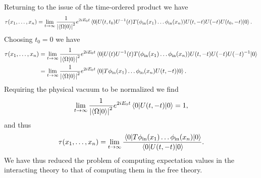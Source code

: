 Returning to the issue of the time-ordered product we have
\begin{align*}
	\tau(x_{1}, \dots, x_{n}) &= \lim\limits_{t\to\infty}\frac{1}{\abs{\braket{\Omega}{0}}^{2}}e^{2iE_{0}t}\expval{U(t, t_{0})U^{-1}(t)\ensuremath{T}(\phi_{\text{in}}(x_{1})\dots\phi_{\text{in}}(x_{n}))U(t, -t)U(-t)U(t_{0}, -t)}{0}.
\end{align*}
Choosing $t_{0} = 0$ we have
\begin{align*}
	\tau(x_{1}, \dots, x_{n}) &= \lim\limits_{t\to\infty}\frac{1}{\abs{\braket{\Omega}{0}}^{2}}e^{2iE_{0}t}\expval{U(t)U^{-1}(t)\ensuremath{T}(\phi_{\text{in}}(x_{1})\dots\phi_{\text{in}}(x_{n}))U(t, -t)U(-t)U(-t)^{-1}}{0} \\
	                          &= \lim\limits_{t\to\infty}\frac{1}{\abs{\braket{\Omega}{0}}^{2}}e^{2iE_{0}t}\expval{\ensuremath{T}\phi_{\text{in}}(x_{1})\dots\phi_{\text{in}}(x_{n})U(t, -t)}{0}.
\end{align*}
Requiring the physical vacuum to be normalized we find
\begin{align*}
	\lim\limits_{t\to\infty}\frac{1}{\abs{\braket{\Omega}{0}}^{2}}e^{2iE_{0}t}\expval{U(t, -t)}{0} = 1,
\end{align*}
and thus
\begin{align*}
	\tau(x_{1}, \dots, x_{n}) = \lim\limits_{t\to\infty}\frac{\expval{\ensuremath{T}\phi_{\text{in}}(x_{1})\dots\phi_{\text{in}}(x_{n})}{0}}{\expval{U(t, -t)}{0}}.
\end{align*}
We have thus reduced the problem of computing expectation values in the interacting theory to that of computing them in the free theory.


